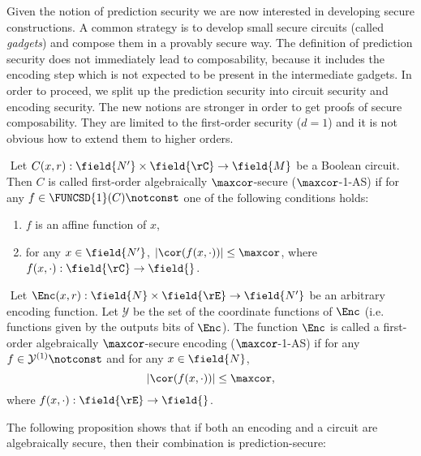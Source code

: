 
Given the notion of prediction security we are now interested in developing secure constructions. A common strategy is to develop small secure circuits (called \emph{gadgets}) and compose them in a provably secure way. The definition of prediction security does not immediately lead to composability, because it includes the encoding step which is not expected to be present in the intermediate gadgets. In order to proceed, we split up the prediction security into circuit security and encoding security. The new notions are stronger in order to get proofs of secure composability. They are limited to the first-order security ($d=1$) and it is not obvious how to extend them to higher orders.

\begin{definition}$ $\newline
Let $C(x,r): \field{N'} \times \field{\rC} \to \field{M}$ be a Boolean circuit. Then $C$ is called first-order algebraically $\maxcor$-secure ($\maxcor$-1-AS) if for any $f \in \FUNCSD{1}(C)\notconst$ one of the following conditions holds:
\begin{enumerate}
    \item $f$ is an affine function of $x$,
    \item for any $x \in \field{N'}$, $|\cor(f(x, \cdot))| \le \maxcor$, where $f(x, \cdot): \field{\rC} \to \field{}$.
\end{enumerate}
\end{definition}
 
\begin{definition}$ $\newline
Let $\Enc(x,r): \field{N} \times \field{\rE} \to \field{N'}$ be an arbitrary encoding function. Let $\mathcal{Y}$ be the set of the coordinate functions of $\Enc$ (i.e. functions given by the outputs bits of $\Enc$).
The function $\Enc$ is called a first-order algebraically $\maxcor$-secure encoding ($\maxcor$-1-AS) if for any $f \in \mathcal{Y}^{(1)}\notconst$ and for any $x \in \field{N}$,
$$
    |\cor(f(x, \cdot))| \le \maxcor,
$$
where $f(x, \cdot): \field{\rE} \to \field{}$.
\end{definition}

The following proposition shows that if both an encoding and a circuit are algebraically secure, then their combination is prediction-secure:

